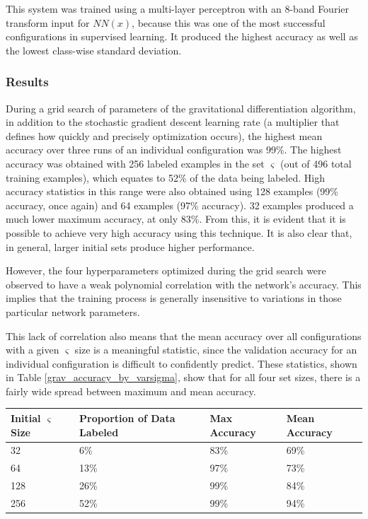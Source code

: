 \documentclass[10pt]{article}
\begin{document}
This system was trained using a multi-layer perceptron with an 8-band Fourier transform input for $NN(x)$, because this was one of the most successful configurations in supervised learning. It produced the highest accuracy as well as the lowest class-wise standard deviation.

\subsubsection{Results}

During a grid search of parameters of the gravitational differentiation algorithm, in addition to the stochastic gradient descent learning rate (a multiplier that defines how quickly and precisely optimization occurs), the highest mean accuracy over three runs of an individual configuration was 99\%. The highest accuracy was obtained with 256 labeled examples in the set $\varsigma$ (out of 496 total training examples), which equates to 52\% of the data being labeled. High accuracy statistics in this range were also obtained using 128 examples (99\% accuracy, once again) and 64 examples (97\% accuracy). 32 examples produced a much lower maximum accuracy, at only 83\%. From this, it is evident that it is possible to achieve very high accuracy using this technique. It is also clear that, in general, larger initial sets produce higher performance.

However, the four hyperparameters optimized during the grid search were observed to have a weak polynomial correlation with the network's accuracy. This implies that the training process is generally insensitive to variations in those particular network parameters.

This lack of correlation also means that the mean accuracy over all configurations with a given $\varsigma$ size is a meaningful statistic, since the validation accuracy for an individual configuration is difficult to confidently predict. These statistics, shown in Table \ref{grav_accuracy_by_varsigma}, show that for all four set sizes, there is a fairly wide spread between maximum and mean accuracy.

\begin{minipage}{\textwidth}
    \begin{center}
         \label{grav_accuracy_by_varsigma}
        \begin{tabular}{|l|l|l|l|}
            \hline
            Initial $\varsigma$ Size & Proportion of Data Labeled & Max Accuracy & Mean Accuracy \\
            \hline
            32 & 6\% & 83\% & 69\% \\
            \hline
            64 & 13\% & 97\% & 73\% \\
            \hline
            128 & 26\% & 99\% & 84\% \\
            \hline
            256 & 52\% & 99\% & 94\% \\
            \hline
        \end{tabular}
    \end{center}
\end{minipage}
\end{document}
